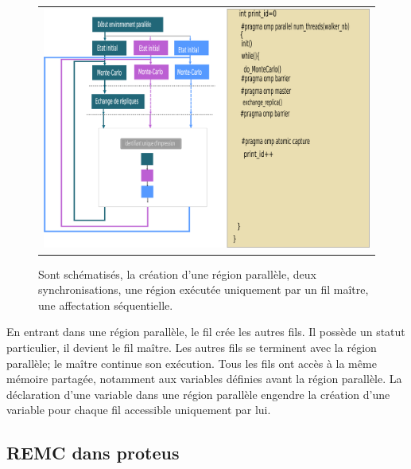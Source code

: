    \begin{figure}[!htbp]
     \centering
     \begin{tabular}{c}
       \includegraphics[width=14cm]{figure/openMP.png} 
     \end{tabular}     
     \caption{ Sont schématisés, la création d'une région parallèle, deux synchronisations, une région exécutée uniquement par un fil maître, une affectation séquentielle. }
\label{fig:openMP}
   \end{figure}

En entrant dans une région parallèle, le fil crée les autres fils. Il possède un statut particulier, il devient le fil maître. Les autres fils se terminent avec la région parallèle; le maître continue son exécution. Tous les fils ont accès à la même mémoire partagée, notamment aux variables définies avant la région parallèle. La déclaration d'une variable dans une région parallèle engendre la création d'une variable pour chaque fil accessible uniquement par lui. 
   

\subsection{REMC dans proteus}

